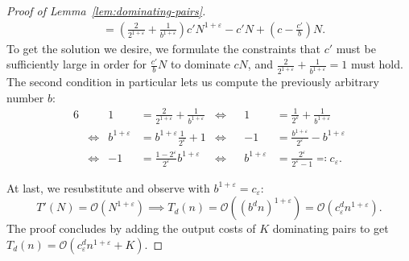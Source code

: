 \begin{proof}[Proof of Lemma~\ref{lem:dominating-pairs}]
\begin{align*}
         &= \left( \frac{2}{2^{1 + \varepsilon}} + \frac{1}{b^{1 + \varepsilon}} \right) c' N^{1 + \varepsilon} - c' N + \left( c - \frac{c'}{b} \right) N.
    \end{align*}
    To get the solution we desire, we formulate the constraints that $c'$ must be sufficiently large in order for $\frac{c'}{b} N$ to dominate $c N$, and $\frac{2}{2^{1 + \varepsilon}} + \frac{1}{b^{1 + \varepsilon}} = 1$ must hold.
    The second condition in particular lets us compute the previously arbitrary number $b$:
    \begin{alignat*}{6}
        &\phantom{\iff} &1 &= \frac{2}{2^{1 + \varepsilon}} + \frac{1}{b^{1 + \varepsilon}} &\iff &&1 &= \frac{1}{2^\varepsilon} + \frac{1}{b^{1 + \varepsilon}} \\
        &\iff &b^{1 + \varepsilon} &= b^{1 + \varepsilon} \frac{1}{2^\varepsilon} + 1 &\iff &&-1 &= \frac{b^{1 + \varepsilon}}{2^\varepsilon} - b^{1 + \varepsilon} \\
        &\iff &-1 &= \frac{1 - 2^\varepsilon}{2^\varepsilon} b^{1 + \varepsilon} &\iff &&b^{1 + \varepsilon} &= \frac{2^\varepsilon}{2^\varepsilon - 1} \eqqcolon c_\varepsilon.
    \end{alignat*}


    At last, we resubstitute and observe with $b^{1 + \varepsilon} = c_\varepsilon$:
    \[
        T'(N) = \mathcal{O}\left( N^{1 + \varepsilon} \right) \implies T_d(n) = \mathcal{O}\left( {\left( b^d n \right)}^{1 + \varepsilon} \right) = \mathcal{O}\left( c_\varepsilon^d n^{1 + \varepsilon} \right).
    \]
    The proof concludes by adding the output costs of $K$ dominating pairs to get $T_d(n) = \mathcal{O}\left( c_\varepsilon^d n^{1 + \varepsilon} + K \right)$.
\end{proof}
